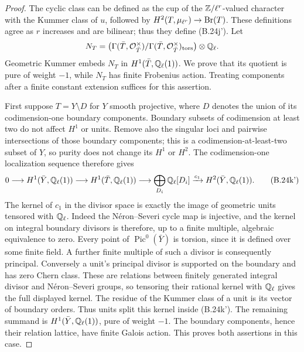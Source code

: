 \begin{proof}
The cyclic class can be defined as the cup of the
\(\mathbb Z/\ell^r\)-valued character with the Kummer class of
\(u\), followed by \(H^2(T,\mu_{\ell^r})\to\operatorname{Br}(T)\).
These definitions agree as \(r\) increases and are bilinear;
thus they define (B.24j').  Let
\[
 N_T=\bigl(\Gamma(\bar T,\mathcal O_{\bar T}^\times)
                     /\Gamma(\bar T,\mathcal O_{\bar T}^\times)_{\rm tors}
              \bigr)\otimes\mathbb Q_\ell.
\]
Geometric Kummer embeds \(N_T\) in
\(H^1(\bar T,\mathbb Q_\ell(1))\).  We prove that its quotient
is pure of weight \(-1\), while \(N_T\) has finite
Frobenius action.  Treating components after a finite constant
extension suffices for this assertion.

First suppose \(T=Y\setminus D\) for \(Y\) smooth
projective, where \(D\) denotes the union of its
codimension-one boundary components.  Boundary subsets of
codimension at least two do not affect \(H^1\) or units.
Remove also the singular loci and pairwise intersections of
those boundary components; this is a codimension-at-least-two
subset of \(Y\), so purity does not change its \(H^1\)
or \(H^2\).  The codimension-one localization sequence
therefore gives
\[
 0\longrightarrow H^1(\bar Y,\mathbb Q_\ell(1))
 \longrightarrow H^1(\bar T,\mathbb Q_\ell(1))
 \longrightarrow \bigoplus_{D_i}\mathbb Q_\ell[D_i]
 \xrightarrow{c_1}H^2(\bar Y,\mathbb Q_\ell(1)).         \tag{B.24k'}
\]
The kernel of \(c_1\) in the divisor space is exactly
the image of geometric units tensored with \(\mathbb Q_\ell\).
Indeed the N\'eron--Severi cycle map is injective, and the
kernel on integral boundary divisors is therefore, up to a
finite multiple, algebraic equivalence to zero.  Every point
of \(\operatorname{Pic}^0(\bar Y)\) is torsion, since it
is defined over some finite field.  A further finite multiple
of such a divisor is consequently principal.  Conversely a
unit's principal divisor is supported on the boundary and has
zero Chern class.  These are relations between finitely
generated integral divisor and N\'eron--Severi groups, so
tensoring their rational kernel with \(\mathbb Q_\ell\) gives
the full displayed kernel.  The residue of the Kummer class
of a unit is its vector of boundary orders.  Thus units split
this kernel inside (B.24k').  The remaining summand is
\(H^1(\bar Y,\mathbb Q_\ell(1))\), pure of weight \(-1\).
The boundary components, hence their relation lattice, have
finite Galois action.  This proves both assertions in this case.


\end{proof}
